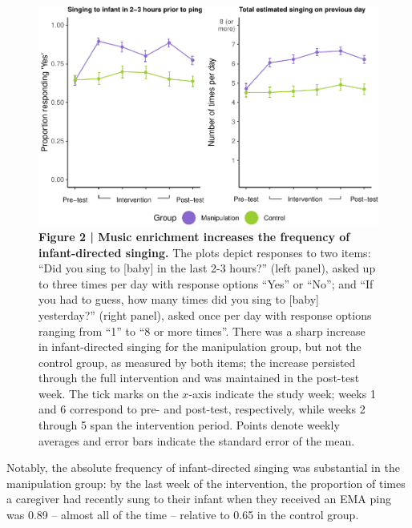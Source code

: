 \documentclass[
]{article}
\begin{document}
\begin{figure}[p]
\includegraphics{MIPH_childdev_files/figure-latex/fig2-1} \caption{\textbf{Figure 2 | Music enrichment increases the frequency of infant-directed singing.} The plots depict responses to two items: ``Did you sing to [baby] in the last 2-3 hours?'' (left panel), asked up to three times per day with response options ``Yes'' or ``No''; and ``If you had to guess, how many times did you sing to [baby] yesterday?'' (right panel), asked once per day with response options ranging from ``1'' to ``8 or more times''. There was a sharp increase in infant-directed singing for the manipulation group, but not the control group, as measured by both items; the increase persisted through the full intervention and was maintained in the post-test week. The tick marks on the $x$-axis indicate the study week; weeks 1 and 6 correspond to pre- and post-test, respectively, while weeks 2 through 5 span the intervention period. Points denote weekly averages and error bars indicate the standard error of the mean.}\label{fig:fig2}
\end{figure}

Notably, the absolute frequency of infant-directed singing was
substantial in the manipulation group: by the last week of the
intervention, the proportion of times a caregiver had recently sung to
their infant when they received an EMA ping was 0.89 -- almost all of
the time -- relative to 0.65 in the control group.
\end{document}
